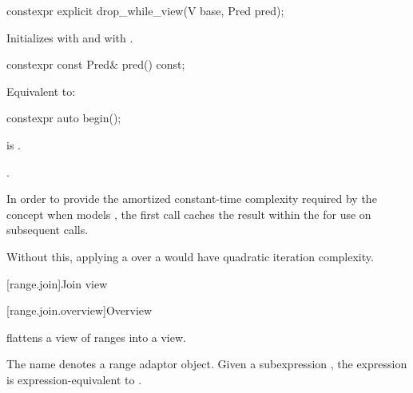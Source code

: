 %
\begin{itemdecl}
constexpr explicit drop_while_view(V base, Pred pred);
\end{itemdecl}

\begin{itemdescr}
\pnum
\effects
Initializes  with  and
 with .
\end{itemdescr}

%
\begin{itemdecl}
constexpr const Pred& pred() const;
\end{itemdecl}

\begin{itemdescr}
\pnum
\effects
Equivalent to: 
\end{itemdescr}

%
\begin{itemdecl}
constexpr auto begin();
\end{itemdecl}

\begin{itemdescr}
\pnum
\expects
{} is .

\pnum
\returns
{}.

\pnum
\remarks
In order to provide the amortized constant-time complexity
required by the  concept
when  models ,
the first call caches the result within the 
for use on subsequent calls.
\begin{note}
Without this,
applying a  over a 
would have quadratic iteration complexity.
\end{note}
\end{itemdescr}

[range.join]{Join view}

[range.join.overview]{Overview}

\pnum
{} flattens a view of ranges into a view.

\pnum
{}%
The name  denotes a
range adaptor object.
Given a subexpression , the expression
 is expression-equivalent to
.

